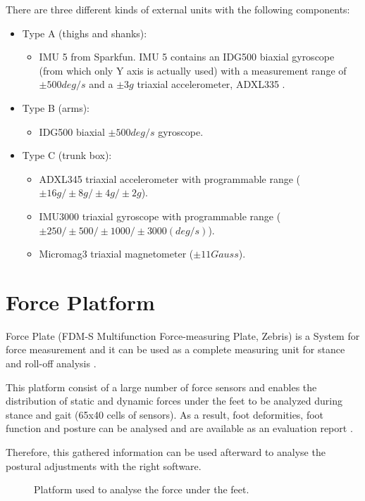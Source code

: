 There are three different kinds of external units with the following components:
\begin{itemize}
	\item Type A (thighs and shanks): 
	\begin{itemize}
		\item IMU 5 from Sparkfun. IMU 5 contains an IDG500  biaxial gyroscope (from which only Y axis is actually used) with a measurement range of $\pm500deg/s$ and a $\pm3g$ triaxial accelerometer, ADXL335 .
	\end{itemize}
	\item Type B (arms):
	\begin{itemize}
		\item IDG500  biaxial $\pm500deg/s$ gyroscope.
	\end{itemize}
	\item Type C (trunk box):
	\begin{itemize}
		\item ADXL345  triaxial accelerometer with programmable range ($\pm16g/\pm8g/\pm4g/\pm2g$).
		\item IMU3000 triaxial gyroscope with programmable range ($\pm250/\pm500/\pm1000/\pm3000 (deg/s)$).
		\item Micromag3  triaxial magnetometer ($\pm11Gauss$).
	\end{itemize}
\end{itemize}


\section{Force Platform}
Force Plate (FDM-S Multifunction Force-measuring Plate, Zebris) is a System for force measurement and it can be used as a complete measuring unit for stance and roll-off analysis \cite{forceplate}.

This platform consist of a large number of force sensors and enables the distribution of static and dynamic forces under the feet to be analyzed during stance and gait (65x40 cells of sensors). As a result, foot deformities, foot function and posture can be analysed and are available as an evaluation report \cite{forceplate}.

Therefore, this gathered information can be used afterward to analyse the postural adjustments with the right software.

\begin{figure}[H]
	\centering
	\caption{Platform used to analyse the force under the feet.}
	\label{fig:FDMS}
\end{figure}


